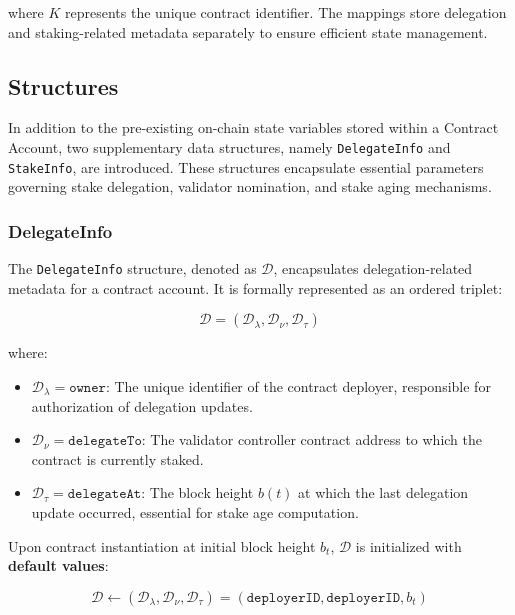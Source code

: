 \documentclass{article}
\begin{document}
where \( K \) represents the unique contract identifier. The mappings store delegation and staking-related metadata separately to ensure efficient state management.

\subsection{Structures}

In addition to the pre-existing on-chain state variables stored within a Contract Account, two supplementary data structures, namely \texttt{DelegateInfo} and \texttt{StakeInfo}, are introduced. These structures encapsulate essential parameters governing stake delegation, validator nomination, and stake aging mechanisms.

\subsubsection{DelegateInfo}  

The \texttt{DelegateInfo} structure, denoted as $\mathcal{D}$, encapsulates delegation-related metadata for a contract account. It is formally represented as an ordered triplet:

\begin{equation}
\mathcal{D} = (\mathcal{D}_\lambda, \mathcal{D}_\nu, \mathcal{D}_\tau)
\end{equation}

where:  
\begin{itemize}
    \item $\mathcal{D}_\lambda = \texttt{owner}$: The unique identifier of the contract deployer, responsible for authorization of delegation updates.
    \item $\mathcal{D}_\nu = \texttt{delegateTo}$: The validator controller contract address to which the contract is currently staked.
    \item $\mathcal{D}_\tau = \texttt{delegateAt}$: The block height $b(t)$ at which the last delegation update occurred, essential for stake age computation.
\end{itemize}

Upon contract instantiation at initial block height $b_t$, $\mathcal{D}$ is initialized with \textbf{default values}:

\begin{equation}
\mathcal{D} \gets (\mathcal{D}_\lambda, \mathcal{D}_\nu, \mathcal{D}_\tau) = (\texttt{deployerID}, \texttt{deployerID}, b_t)
\end{equation}
\end{document}
